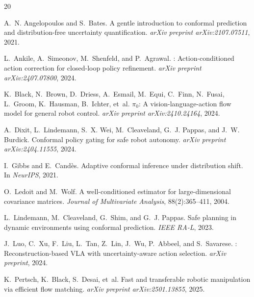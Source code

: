 \documentclass[letterpaper]{article}
\begin{document}

\begin{thebibliography}{20}

A.~N. Angelopoulos and S.~Bates.
\newblock A gentle introduction to conformal prediction and distribution-free uncertainty quantification.
\newblock \emph{arXiv preprint arXiv:2107.07511}, 2021.

L.~Ankile, A.~Simeonov, M.~Shenfeld, and P.~Agrawal.
: Action-conditioned action correction for closed-loop policy refinement.
\newblock \emph{arXiv preprint arXiv:2407.07800}, 2024.

K.~Black, N.~Brown, D.~Driess, A.~Esmail, M.~Equi, C.~Finn, N.~Fusai, L.~Groom, K.~Hausman, B.~Ichter, et~al.
\newblock $\pi_0$: A vision-language-action flow model for general robot control.
\newblock \emph{arXiv preprint arXiv:2410.24164}, 2024.

A.~Dixit, L.~Lindemann, S.~X. Wei, M.~Cleaveland, G.~J. Pappas, and J.~W. Burdick.
\newblock Conformal policy gating for safe robot autonomy.
\newblock \emph{arXiv preprint arXiv:2404.11555}, 2024.

I.~Gibbs and E.~Cand\`{e}s.
\newblock Adaptive conformal inference under distribution shift.
\newblock In \emph{NeurIPS}, 2021.

O.~Ledoit and M.~Wolf.
\newblock A well-conditioned estimator for large-dimensional covariance matrices.
\newblock \emph{Journal of Multivariate Analysis}, 88(2):365--411, 2004.

L.~Lindemann, M.~Cleaveland, G.~Shim, and G.~J. Pappas.
\newblock Safe planning in dynamic environments using conformal prediction.
\newblock \emph{IEEE RA-L}, 2023.

J.~Luo, C.~Xu, F.~Liu, L.~Tan, Z.~Lin, J.~Wu, P.~Abbeel, and S.~Savarese.
: Reconstruction-based VLA with uncertainty-aware action selection.
\newblock \emph{arXiv preprint}, 2024.

K.~Pertsch, K.~Black, S.~Desai, et~al.
\newblock Fast and transferable robotic manipulation via efficient flow matching.
\newblock \emph{arXiv preprint arXiv:2501.13855}, 2025.


\end{thebibliography}
\end{document}
